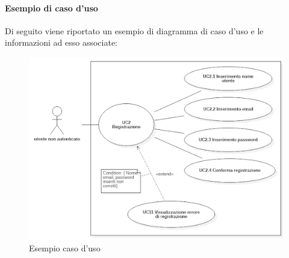             \paragraph{Esempio di caso d’uso}
                Di seguito viene riportato un esempio di diagramma di caso d’uso e le informazioni ad esso associate:
                    \begin{figure}[H]
                            \centering
                            \includegraphics[width=1.0\textwidth]{res/images/esempio_caso_d_uso.png}
                        \caption{Esempio caso d'uso}
                        \label{Esempio caso d'uso: UC2 Registrazione}
                    \end{figure}
